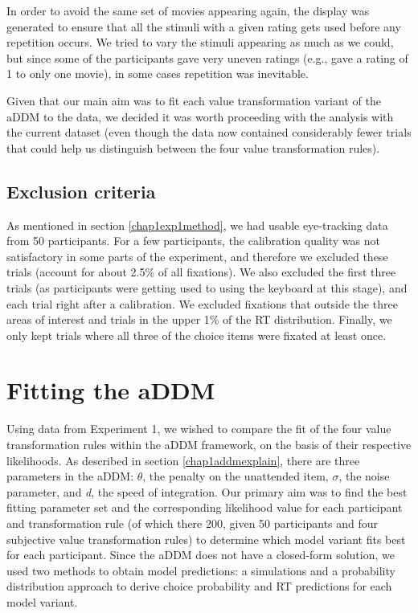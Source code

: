 \documentclass[11pt,a4paper]{article}
\begin{document}
In order to avoid the same set of movies appearing again, the display was generated to ensure that all the stimuli with a given rating gets used before any repetition occurs. We tried to vary the stimuli appearing as much as we could, but since some of the participants gave very uneven ratings (e.g., gave a rating of 1 to only one movie), in some cases repetition was inevitable. 

Given that our main aim was to fit each value transformation variant of the aDDM to the data, we decided it was worth proceeding with the analysis with the current dataset (even though the data now contained considerably fewer trials that could help us distinguish between the four value transformation rules). 

\subsection{Exclusion criteria}

As mentioned in section  \ref{chap1exp1method}, we had usable eye-tracking data from 50 participants. For a few participants, the calibration quality was not satisfactory in some parts of the experiment, and therefore we excluded these trials (account for about 2.5\% of all fixations). We also excluded the first three trials (as participants were getting used to using the keyboard at this stage), and each trial right after a calibration. We excluded fixations that outside the three areas of interest and trials in the upper 1\% of the RT distribution. Finally, we only kept trials where all three of the choice items were fixated at least once. 


\section{Fitting the aDDM}

Using data from Experiment 1, we wished to compare the fit of the four value transformation rules within the aDDM framework, on the basis of their respective likelihoods. As described in section \ref{chap1addmexplain}, there are three parameters in the aDDM: $\theta$, the penalty on the unattended item, $\sigma$, the noise parameter, and \textit{d}, the speed of integration. Our primary aim was to find the best fitting parameter set and the corresponding likelihood value for each participant and transformation rule (of which there 200, given 50 participants and four subjective value transformation rules) to determine which model variant fits best for each participant. Since the aDDM does not have a closed-form solution, we used two methods to obtain model predictions: a simulations and a probability distribution approach to derive choice probability and RT predictions for each model variant.
\end{document}
